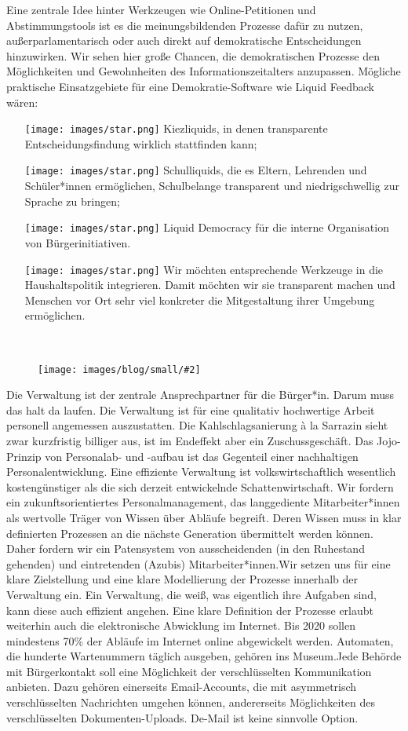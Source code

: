 \documentclass[a4paper,10pt]{article}
\newcommand{\mysection}[1]{{\vspace{1cm}\noindent\color{gray}{\ttfamily\LARGE\raggedright #1}\\\medskip}}
\newcommand{\abschnitt}[2]{%
\mysection{\raggedright #1}%
\begin{figure}[t]%
\vspace*{-2.7cm}%
\hspace*{-2.1cm}%
\texttt{[image: images/blog/small/\#2]} %
\end{figure}%
}
\begin{document}
Eine zentrale Idee hinter Werkzeugen wie Online-Petitionen und
Abstimmungstools ist es die meinungsbildenden Prozesse dafür zu nutzen,
außerparlamentarisch oder auch direkt auf demokratische Entscheidungen
hinzuwirken. Wir sehen hier große Chancen, die demokratischen Prozesse
den Möglichkeiten und Gewohnheiten des Informationszeitalters
anzupassen. Mögliche praktische Einsatzgebiete für eine
Demokratie-Software wie Liquid Feedback wären:

\begin{itemize}
\itemsep1pt\parskip0pt
\item[\texttt{[image: images/star.png]}]
  Kiezliquids, in denen transparente Entscheidungsfindung wirklich
  stattfinden kann;
\item[\texttt{[image: images/star.png]}]
  Schulliquids, die es Eltern, Lehrenden und Schüler*innen ermöglichen,
  Schulbelange transparent und niedrigschwellig zur Sprache zu bringen;
\item[\texttt{[image: images/star.png]}]
  Liquid Democracy für die interne Organisation von Bürgerinitiativen.
\item[\texttt{[image: images/star.png]}]
  Wir möchten entsprechende Werkzeuge in die Haushaltspolitik
  integrieren. Damit möchten wir sie transparent machen und Menschen vor
  Ort sehr viel konkreter die Mitgestaltung ihrer Umgebung ermöglichen.
\end{itemize}

\clearpage
\abschnitt{Verwaltung}{GefahrengebietTermine.png}

\enlargethispage{2\baselineskip}
Die Verwaltung ist der zentrale Ansprechpartner für die Bürger*in.
Darum muss das halt da laufen. Die Verwaltung ist für eine qualitativ
hochwertige Arbeit personell angemessen auszustatten. Die
Kahlschlagsanierung à la Sarrazin sieht zwar kurzfristig billiger aus,
ist im Endeffekt aber ein Zuschussgeschäft. Das Jojo-Prinzip von
Personalab- und -aufbau ist das Gegenteil einer nachhaltigen
Personalentwicklung. Eine effiziente Verwaltung ist volkswirtschaftlich
wesentlich kostengünstiger als die sich derzeit entwickelnde
Schattenwirtschaft. Wir fordern ein zukunftsorientiertes
Personalmanagement, das langgediente Mitarbeiter*innen als wertvolle
Träger von Wissen über Abläufe begreift. Deren Wissen muss in klar
definierten Prozessen an die nächste Generation übermittelt werden
können. Daher fordern wir ein Patensystem von ausscheidenden (in den
Ruhestand gehenden) und eintretenden (Azubis) Mitarbeiter*innen.Wir
setzen uns für eine klare Zielstellung und eine klare Modellierung der
Prozesse innerhalb der Verwaltung ein. Ein Verwaltung, die weiß, was
eigentlich ihre Aufgaben sind, kann diese auch effizient angehen. Eine
klare Definition der Prozesse erlaubt weiterhin auch die elektronische
Abwicklung im Internet. Bis 2020 sollen mindestens 70\% der Abläufe im
Internet online abgewickelt werden. Automaten, die hunderte Wartenummern
täglich ausgeben, gehören ins Museum.Jede Behörde mit Bürgerkontakt soll
eine Möglichkeit der verschlüsselten Kommunikation anbieten. Dazu
gehören einerseits Email-Accounts, die mit asymmetrisch verschlüsselten
Nachrichten umgehen können, andererseits Möglichkeiten des
verschlüsselten Dokumenten-Uploads. De-Mail ist keine sinnvolle Option.
\end{document}
